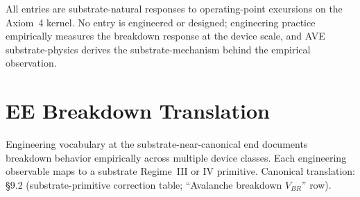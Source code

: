 \noindent
All entries are substrate-natural responses to operating-point excursions on the Axiom~4 kernel. No entry is engineered or designed; engineering practice empirically measures the breakdown response at the device scale, and AVE substrate-physics derives the substrate-mechanism behind the empirical observation.

\section{EE Breakdown Translation}
\label{sec:vol9_ee_breakdown_translation}

Engineering vocabulary at the substrate-near-canonical end documents breakdown behavior empirically across multiple device classes. Each engineering observable maps to a substrate Regime~III or IV primitive. Canonical translation:  \S 9.2 (substrate-primitive correction table; ``Avalanche breakdown $V_{BR}$'' row).

